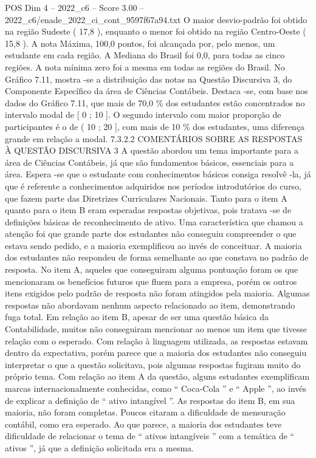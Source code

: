 \begin{textsample}{POS Dim 4 – 2022\_c6 – Score 3.00 – 2022\_c6/enade\_2022\_ci\_cont\_9597f67a94.txt}
O maior desvio-padrão foi obtido na região Sudeste ( 17,8 ), enquanto o menor foi obtido na região Centro-Oeste ( 15,8 ).
A nota Máxima, 100,0 pontos, foi alcançada por, pelo menos, um estudante em cada região.
A Mediana do Brasil foi 0,0, para todas as cinco regiões.
A nota mínima zero foi a mesma em todas as regiões do Brasil.
No Gráfico 7.11, mostra -se a distribuição das notas na Questão Discursiva 3, do Componente Específico da área de Ciências Contábeis.
Destaca -se, com base nos dados do Gráfico 7.11, que mais de 70,0 \% dos estudantes estão concentrados no intervalo modal de [ 0 ; 10 ].
O segundo intervalo com maior proporção de participantes é o de ( 10 ; 20 ], com mais de 10 \% dos estudantes, uma diferença grande em relação a modal. 7.3.2.2 COMENTÁRIOS SOBRE AS RESPOSTAS À QUESTÃO DISCURSIVA 3 A questão abordou um tema importante para a área de Ciências Contábeis, já que são fundamentos básicos, essenciais para a área.
Espera -se que o estudante com conhecimentos básicos consiga resolvê -la, já que é referente a conhecimentos adquiridos nos períodos introdutórios do curso, que fazem parte das Diretrizes Curriculares Nacionais.
Tanto para o item A quanto para o item B eram esperadas respostas objetivas, pois tratava -se de definições básicas de reconhecimento de ativo.
Uma característica que chamou a atenção foi que grande parte dos estudantes não conseguiu compreender o que estava sendo pedido, e a maioria exemplificou ao invés de conceituar.
A maioria dos estudantes não respondeu de forma semelhante ao que constava no padrão de resposta.
No item A, aqueles que conseguiram alguma pontuação foram os que mencionaram os benefícios futuros que fluem para a empresa, porém os outros itens exigidos pelo padrão de resposta não foram atingidos pela maioria.
Algumas respostas não abordavam nenhum aspecto relacionado ao item, demonstrando fuga total.
Em relação ao item B, apesar de ser uma questão básica da Contabilidade, muitos não conseguiram mencionar ao menos um item que tivesse relação com o esperado.
Com relação à linguagem utilizada, as respostas estavam dentro da expectativa, porém parece que a maioria dos estudantes não conseguiu interpretar o que a questão solicitava, pois algumas respostas fugiram muito do próprio tema.
Com relação ao item A da questão, alguns estudantes exemplificam marcas internacionalmente conhecidas, como “ Coca-Cola ” e “ Apple ”, ao invés de explicar a definição de “ ativo intangível ”.
As respostas do item B, em sua maioria, não foram completas.
Poucos citaram a dificuldade de mensuração contábil, como era esperado.
Ao que parece, a maioria dos estudantes teve dificuldade de relacionar o tema de “ ativos intangíveis ” com a temática de “ ativos ”, já que a definição solicitada era a mesma.

\end{textsample}
